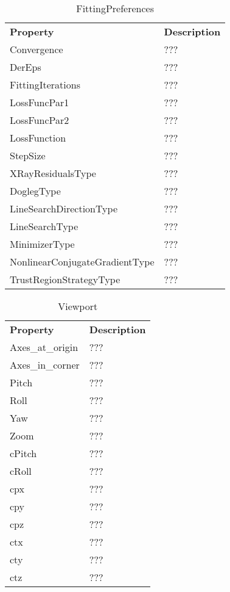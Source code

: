 \documentclass[12pt]{article}
\begin{document}
\begin{center}
	\begin{table}[]
		\centering
		\caption{FittingPreferences}
		\begin{tabular}{ll}
			\textbf{Property}     & \textbf{Description} \\
			Convergence           & ???                  \\
			DerEps          & ???                  \\
			FittingIterations & ???                  \\
			LossFuncPar1  & ???                  \\
			LossFuncPar2         & ???                  \\
			LossFunction & ???                 \\
			StepSize    & ??? \\
			XRayResidualsType & ??? \\
			DoglegType & ???\\
			LineSearchDirectionType & ???\\
			LineSearchType    & ??? \\
			MinimizerType & ??? \\
			NonlinearConjugateGradientType & ???\\
			TrustRegionStrategyType & ???
		\end{tabular}
	\end{table}
\end{center}   

\begin{center}
	\begin{table}[]
		\centering
		\caption{Viewport}
		\begin{tabular}{ll}
			\textbf{Property}     & \textbf{Description} \\
			Axes\_at\_origin           & ???                  \\
			Axes\_in\_corner          & ???                  \\
			Pitch & ???                  \\
			Roll  & ???                  \\
			Yaw         & ???                  \\
			Zoom & ???                 \\
			cPitch    & ??? \\
			cRoll & ??? \\
			cpx & ???\\
			cpy & ???\\
			cpz    & ??? \\
			ctx & ??? \\
			cty & ???\\
			ctz & ???
		\end{tabular}
	\end{table}
\end{center}   
\end{document}
